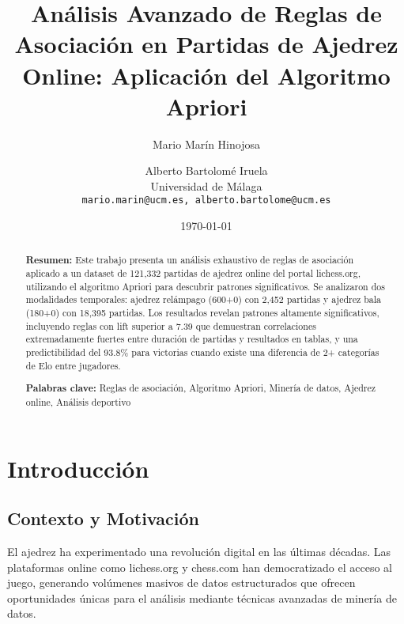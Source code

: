 \documentclass[11pt,a4paper]{article}
\begin{document}
\title{\textbf{An\'alisis Avanzado de Reglas de Asociaci\'on en Partidas de Ajedrez Online: Aplicaci\'on del Algoritmo Apriori}}

\author{Mario Mar\'in Hinojosa \and Alberto Bartolom\'e Iruela\\
\small Universidad de Málaga\\
\small \texttt{mario.marin@ucm.es, alberto.bartolome@ucm.es}}

\date{\today}

\maketitle

\begin{abstract}
\noindent \textbf{Resumen:} Este trabajo presenta un an\'alisis exhaustivo de reglas de asociaci\'on aplicado a un dataset de 121,332 partidas de ajedrez online del portal lichess.org, utilizando el algoritmo Apriori para descubrir patrones significativos. Se analizaron dos modalidades temporales: ajedrez rel\'ampago (600+0) con 2,452 partidas y ajedrez bala (180+0) con 18,395 partidas. Los resultados revelan patrones altamente significativos, incluyendo reglas con lift superior a 7.39 que demuestran correlaciones extremadamente fuertes entre duraci\'on de partidas y resultados en tablas, y una predictibilidad del 93.8\% para victorias cuando existe una diferencia de 2+ categor\'ias de Elo entre jugadores.

\noindent \textbf{Palabras clave:} Reglas de asociaci\'on, Algoritmo Apriori, Miner\'ia de datos, Ajedrez online, An\'alisis deportivo
\end{abstract}

\tableofcontents
\newpage

\section{Introducci\'on}

\subsection{Contexto y Motivaci\'on}

El ajedrez ha experimentado una revoluci\'on digital en las \'ultimas d\'ecadas. Las plataformas online como lichess.org y chess.com han democratizado el acceso al juego, generando vol\'umenes masivos de datos estructurados que ofrecen oportunidades \'unicas para el an\'alisis mediante t\'ecnicas avanzadas de miner\'ia de datos.
\end{document}
